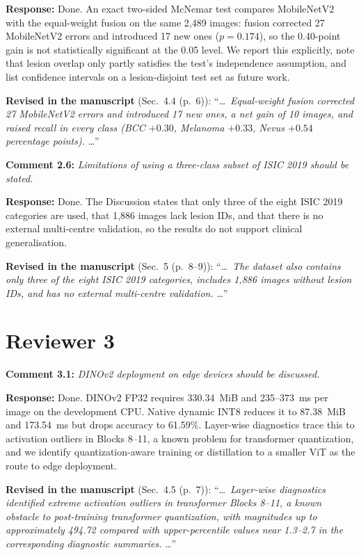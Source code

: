 \documentclass[11pt,a4paper]{article}
\begin{document}
\textbf{Response:} Done. An exact two-sided McNemar test compares MobileNetV2 with the equal-weight fusion on the same 2,489 images: fusion corrected 27 MobileNetV2 errors and introduced 17 new ones ($p = 0.174$), so the 0.40-point gain is not statistically significant at the 0.05 level. We report this explicitly, note that lesion overlap only partly satisfies the test's independence assumption, and list confidence intervals on a lesion-disjoint test set as future work.

\textbf{Revised in the manuscript} (Sec.~4.4 (p.~6)): ``\ldots\ \emph{Equal-weight fusion corrected 27 MobileNetV2 errors and introduced 17 new ones, a net gain of 10 images, and raised recall in every class (BCC $+0.30$, Melanoma $+0.33$, Nevus $+0.54$ percentage points).} \ldots''

\medskip
\textbf{Comment 2.6:} \emph{Limitations of using a three-class subset of ISIC 2019 should be stated.}

\textbf{Response:} Done. The Discussion states that only three of the eight ISIC 2019 categories are used, that 1,886 images lack lesion IDs, and that there is no external multi-centre validation, so the results do not support clinical generalisation.

\textbf{Revised in the manuscript} (Sec.~5 (p.~8--9)): ``\ldots\ \emph{The dataset also contains only three of the eight ISIC 2019 categories, includes 1,886 images without lesion IDs, and has no external multi-centre validation.} \ldots''


\section*{Reviewer 3}
\textbf{Comment 3.1:} \emph{DINOv2 deployment on edge devices should be discussed.}

\textbf{Response:} Done. DINOv2 FP32 requires 330.34~MiB and 235--373~ms per image on the development CPU. Native dynamic INT8 reduces it to 87.38~MiB and 173.54~ms but drops accuracy to 61.59\%. Layer-wise diagnostics trace this to activation outliers in Blocks 8--11, a known problem for transformer quantization, and we identify quantization-aware training or distillation to a smaller ViT as the route to edge deployment.

\textbf{Revised in the manuscript} (Sec.~4.5 (p.~7)): ``\ldots\ \emph{Layer-wise diagnostics identified extreme activation outliers in transformer Blocks 8--11, a known obstacle to post-training transformer quantization, with magnitudes up to approximately 494.72 compared with upper-percentile values near 1.3--2.7 in the corresponding diagnostic summaries.} \ldots''
\end{document}
